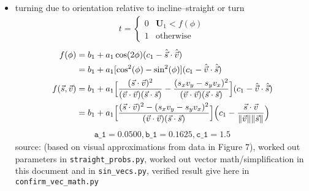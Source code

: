 \documentclass{article}
\theoremstyle{definition}
\DeclarePairedDelimiter\norm{\lVert}{\rVert}%
\begin{document}
\begin{itemize}
\begin{itemize}
      	\item turning due to orientation relative to incline--straight or turn
        \begin{align*}
			t =
			\begin{cases} 
      			0 & \bm{U}_1 < f(\phi) \\
      			1 & \text{otherwise}
   			\end{cases}
		\end{align*}
        \begin{align*}
        	f(\phi) 
            &= b_1 + a_1\cos(2\phi)(c_1 - \hat{\vec{s}} \cdot \hat{\vec{v}}) \\
            &= b_1 + a_1[\cos^2(\phi)-\sin^2(\phi)](c_1 - \hat{\vec{v}} \cdot \hat{\vec{s}}) \\
            f(\vec{s}, \vec{v}) 
            &= b_1 + a_1\Big[\frac{(\vec{s} \cdot \vec{v})^2}{(\vec{v}\cdot\vec{v}) (\vec{s} \cdot \vec{s})}-\frac{(s_xv_y-s_yv_x)^2}{(\vec{v}\cdot\vec{v}) (\vec{s} \cdot \vec{s})}\Big](c_1 - \hat{\vec{v}} \cdot \hat{\vec{s}}) \\
            &= b_1 + a_1\Big[\frac{(\vec{s} \cdot \vec{v})^2 - (s_xv_y-s_yv_x)^2}{(\vec{v}\cdot\vec{v}) (\vec{s} \cdot \vec{s})}\Big]\Big(c_1 - \frac{\vec{s} \cdot \vec{v}}{\norm{\vec{v}}\norm{\vec{s}}}\Big) 
        \end{align*}
        \begin{align*}
        \texttt{a\_1} = 0.0500, \texttt{b\_1} = 0.1625, \texttt{c\_1} = 1.5
        \end{align*}
        source: \cite{khuong_how_2013} (based on visual approximations from data in Figure 7), worked out parameters in \texttt{straight_probs.py}, worked out vector math/simplification in this document and in \texttt{sin_vecs.py}, verified result give here in \texttt{confirm_vec_math.py}
        

\end{itemize}
\end{itemize}
\end{document}
